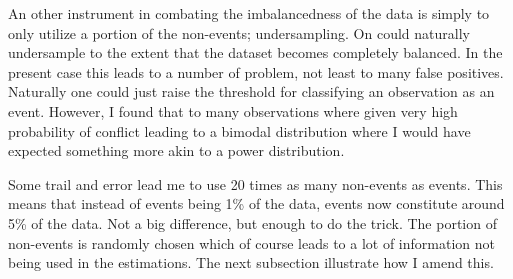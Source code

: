 \documentclass[a4paper]{article}
\begin{document}



An other instrument in combating the imbalancedness of the data is simply to only utilize a portion of the non-events; undersampling. On could naturally undersample to the extent that the dataset becomes completely balanced. In the present case this leads to a number of problem, not least to many false positives. Naturally one could just raise the threshold for classifying an observation as an event. However, I found that to many observations where given very high probability of conflict leading to a bimodal distribution where I would have expected something more akin to a power distribution.\par %

Some trail and error lead me to use 20 times as many non-events as events. This means that instead of events being 1\% of the data, events now constitute around 5\% of the data. Not a big difference, but enough to do the trick. The portion of non-events is randomly chosen which of course leads to a lot of information not being used in the estimations. The next subsection illustrate how I amend this.\par
\end{document}
